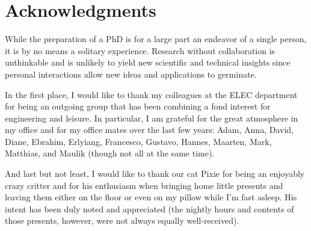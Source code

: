 \chapter*{Acknowledgments}

While the preparation of a PhD is for a large part an endeavor of a single person, it is by no means a solitary experience.
Research without collaboration is unthinkable and is unlikely to yield new scientific and technical insights since personal interactions allow new ideas and applications to germinate.

In the first place, I would like to thank my colleagues at the ELEC department for being an outgoing group that has been combining a fond interest for engineering and leisure.
In particular, I am grateful for the great atmosphere in my office and for my office mates over the last few years: Adam, Anna, David, Diane, Ebrahim, Erlyiang, Francesco, Gustavo, Hannes, Maarten, Mark, Matthias, and Maulik (though not all at the same time).










And last but not least, I would like to thank our cat Pixie for being an enjoyably crazy critter and for his enthusiasm when bringing home little presents and leaving them either on the floor or even on my pillow while I'm fast asleep.
His intent has been duly noted and appreciated (the nightly hours and contents of those presents, however, were not always equally well-received).

